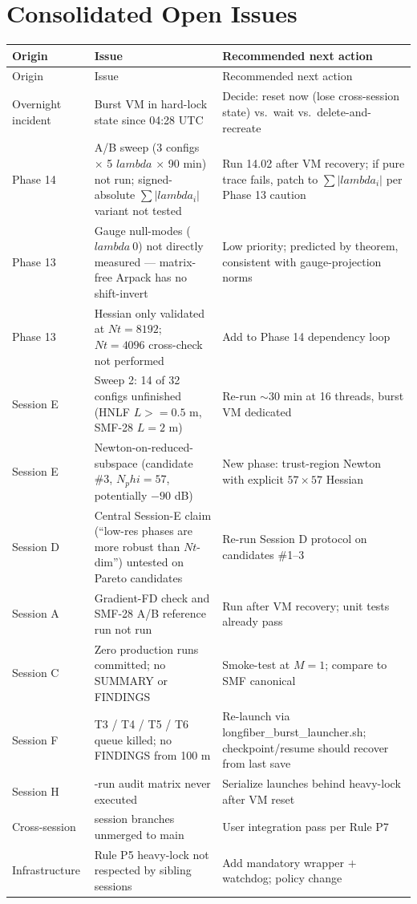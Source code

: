 \documentclass[11pt,letterpaper]{article}
\def\varphi{phi}%
\def\mathrm#1{#1}%
\def\lambda{lambda}%
\def\geq{>=}%
\def\approx{~}%
\def\texttt#1{#1}%
\begin{document}
\newpage
\section{Consolidated Open Issues}

\footnotesize
\begin{longtable}{>{\raggedright\arraybackslash}p{2.3cm}>{\raggedright\arraybackslash}p{8cm}>{\raggedright\arraybackslash}p{5.5cm}}
\toprule
Origin & Issue & Recommended next action \\
\midrule
\endfirsthead
\toprule
Origin & Issue & Recommended next action \\
\midrule
\endhead
Overnight incident & Burst VM in hard-lock state since 04:28 UTC & Decide: reset now (lose cross-session state) vs.\ wait vs.\ delete-and-recreate \\
Phase 14 & 14.02 A/B sweep (3 configs $\times$ 5 $\lambda$ $\times$ 90 min) not run; signed-absolute $\sum |\lambda_i|$ variant not tested & Run 14.02 after VM recovery; if pure trace fails, patch to $\sum |\lambda_i|$ per Phase 13 caution \\
Phase 13 & Gauge null-modes ($\lambda \approx 0$) not directly measured --- matrix-free Arpack has no shift-invert & Low priority; predicted by theorem, consistent with gauge-projection norms \\
Phase 13 & Hessian only validated at $\mathrm{Nt} = 8192$; $\mathrm{Nt} = 4096$ cross-check not performed & Add to Phase 14 dependency loop \\
Session E & Sweep 2: 14 of 32 configs unfinished (HNLF $L \geq 0.5$ m, SMF-28 $L = 2$ m) & Re-run $\sim 30$ min at 16 threads, burst VM dedicated \\
Session E & Newton-on-reduced-subspace (candidate \#3, $\mathrm{N}_\varphi = 57$, potentially $-90$ dB) & New phase: trust-region Newton with explicit $57 \times 57$ Hessian \\
Session D & Central Session-E claim (``low-res phases are more robust than $\mathrm{Nt}$-dim'') untested on Pareto candidates & Re-run Session D protocol on candidates \#1--3 \\
Session A & Gradient-FD check and SMF-28 A/B reference run not run & Run after VM recovery; unit tests already pass \\
Session C & Zero production runs committed; no SUMMARY or FINDINGS & Smoke-test at $M = 1$; compare to SMF canonical \\
Session F & T3 / T4 / T5 / T6 queue killed; no FINDINGS from 100 m & Re-launch via \texttt{longfiber\_burst\_launcher.sh}; checkpoint/resume should recover from last save \\
Session H & 12-run audit matrix never executed & Serialize launches behind heavy-lock after VM reset \\
Cross-session & 7 session branches unmerged to \texttt{main} & User integration pass per Rule P7 \\
Infrastructure & Rule P5 heavy-lock not respected by sibling sessions & Add mandatory wrapper $+$ watchdog; policy change \\
\bottomrule
\end{longtable}
\normalsize
\end{document}
